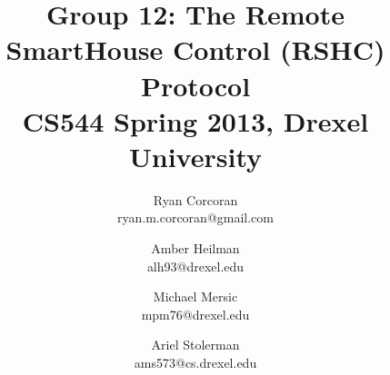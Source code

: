 \documentclass[12pt]{usenixsubmit}
\begin{document}

\title{Group 12: The Remote SmartHouse Control (RSHC) Protocol \\ \Large{CS544 Spring 2013, Drexel University}}

\author{
    Ryan Corcoran \\
    ryan.m.corcoran@gmail.com
    \and
    Amber Heilman \\
    alh93@drexel.edu
    \and
    Michael Mersic \\
    mpm76@drexel.edu
    \and
    Ariel Stolerman \\
    ams573@cs.drexel.edu
}
\date{}

\maketitle

\thispagestyle{empty}



\tableofcontents

\setcounter{page}{1}















%
%


\clearpage


\end{document}
